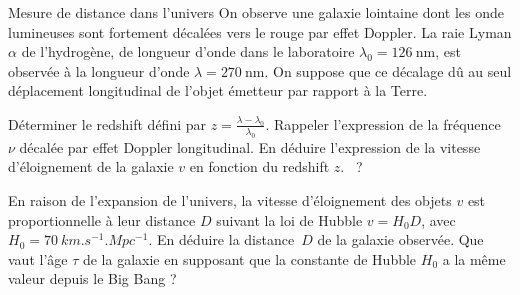 \begin{exo}[PC][1][TD]{Mesure de distance dans l'univers}
  On observe une galaxie lointaine dont les onde lumineuses sont fortement décalées vers le rouge par effet Doppler. La raie Lyman $\alpha$ de l'hydrogène, de longueur d'onde dans le laboratoire $\lambda_0=126 \mathrm{~nm}$, est observée à la longueur d'onde $\lambda=270 \mathrm{~nm}$. On suppose que ce décalage dû au seul déplacement longitudinal de l'objet émetteur par rapport à la Terre.
  \begin{quest}
    \item	Déterminer le redshift défini par $z = \frac{\lambda - \lambda_0}{\lambda_0}$.
    Rappeler l'expression de la fréquence $\nu$ décalée par effet Doppler longitudinal. En déduire l'expression de la vitesse d'éloignement de la galaxie $v$ en fonction du redshift $z$. \AN~?
    \item En raison de l'expansion de l'univers, la vitesse d'éloignement des objets $v$ est proportionnelle à leur distance $D$ suivant la loi de Hubble $v = H_0 D$, avec $H_0 = \SI{70}{km.s^{-1}.Mpc^{-1}}$.
     En déduire la distance~$D$ de la galaxie observée. Que vaut l'âge $\tau$ de la galaxie en supposant que la constante de Hubble $H_0$ a la même valeur depuis le Big Bang ?
\end{quest}
\end{exo}
